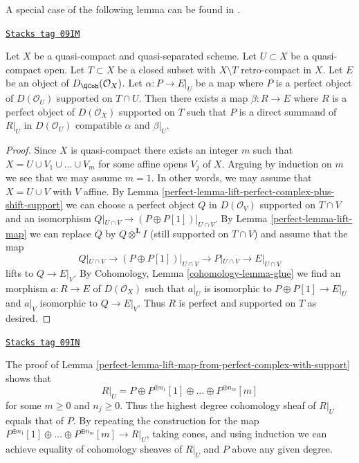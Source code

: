 A special case of the following lemma can be found in
\cite{Neeman-Grothendieck}.

\begin{lemma}
\label{perfect-lemma-lift-map-from-perfect-complex-with-support}
\href{https://stacks.math.columbia.edu/tag/09IM}{\texttt{Stacks tag 09IM}}

Let $X$ be a quasi-compact and quasi-separated scheme.
Let $U \subset X$ be a quasi-compact open. Let $T \subset X$
be a closed subset with $X \setminus T$ retro-compact in $X$.
Let $E$ be an object of $D_\QCoh(\mathcal{O}_X)$.
Let $\alpha : P \to E|_U$ be a map where $P$ is a perfect object of
$D(\mathcal{O}_U)$ supported on $T \cap U$. Then there exists a map
$\beta : R \to E$ where $R$ is a perfect object of $D(\mathcal{O}_X)$
supported on $T$ such that $P$ is a direct summand of $R|_U$ in
$D(\mathcal{O}_U)$ compatible $\alpha$ and $\beta|_U$.
\end{lemma}

\begin{proof}

Since $X$ is quasi-compact there exists an integer $m$ such that
$X = U \cup V_1 \cup \ldots \cup V_m$ for some affine opens $V_j$ of $X$.
Arguing by induction on $m$ we see that we may assume $m = 1$. In other
words, we may assume that $X = U \cup V$ with $V$ affine. By
Lemma \ref{perfect-lemma-lift-perfect-complex-plus-shift-support}
we can choose a perfect object $Q$ in $D(\mathcal{O}_V)$
supported on $T \cap V$ and an isomorphism
$Q|_{U \cap V} \to (P \oplus P[1])|_{U \cap V}$.
By Lemma \ref{perfect-lemma-lift-map} we can replace $Q$ by
$Q \otimes^\mathbf{L} I$ (still supported on $T \cap V$)
and assume that the map
$$
Q|_{U \cap V} \to (P \oplus P[1])|_{U \cap V}
\longrightarrow P|_{U \cap V}
\longrightarrow
E|_{U \cap V}
$$
lifts to $Q \to E|_V$. By
Cohomology, Lemma \ref{cohomology-lemma-glue}
we find an morphism $a : R \to E$ of $D(\mathcal{O}_X)$
such that $a|_U$ is isomorphic to $P \oplus P[1] \to E|_U$
and $a|_V$ isomorphic to $Q \to E|_V$.
Thus $R$ is perfect and supported on $T$ as desired.
\end{proof}

\begin{remark}[Addendum]
\label{perfect-remark-addendum}
\href{https://stacks.math.columbia.edu/tag/09IN}{\texttt{Stacks tag 09IN}}

The proof of Lemma \ref{perfect-lemma-lift-map-from-perfect-complex-with-support}
shows that
$$
R|_U = P \oplus P^{\oplus n_1}[1] \oplus \ldots \oplus P^{\oplus n_m}[m]
$$
for some $m \geq 0$ and $n_j \geq 0$. Thus the highest degree cohomology sheaf
of $R|_U$ equals that of $P$. By repeating the construction for the map
$P^{\oplus n_1}[1] \oplus \ldots \oplus P^{\oplus n_m}[m] \to R|_U$, taking
cones, and using induction we can achieve equality of cohomology sheaves
of $R|_U$ and $P$ above any given degree.
\end{remark}

